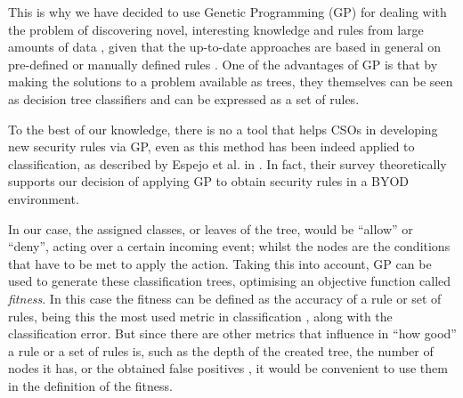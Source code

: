 \documentclass[runningheads]{llncs}
\begin{document}
This is why we have decided to use Genetic Programming (GP) for
dealing with the problem of discovering novel, interesting knowledge
and rules from large amounts of data \cite{freitas2002data}, given
that the up-to-date approaches are based in general on pre-defined or
manually defined rules \cite{ali2015analysis}. One of
the advantages of GP is that by making the solutions to a problem
available as trees, they themselves can be seen as decision
tree classifiers \cite{safavian1990survey} and can be expressed as a
set of rules.

To the best of our knowledge, there is no a tool that helps CSOs in
developing new security rules via GP, even as this method has been
indeed applied to classification, as described by Espejo et al. in
\cite{espejo2010survey}. In fact, their survey theoretically supports our
decision of applying GP to obtain security rules in a BYOD
environment.

In our case, the assigned classes, or leaves of the tree, would be ``allow''
or ``deny'', acting over a certain incoming event; whilst the nodes
are the conditions that have to be met to apply the action. Taking
this into account, GP can be used to generate these classification
trees, optimising an objective function called {\em fitness}. In this case the
fitness can be defined as the accuracy of a rule or set of rules, being this the most
used metric in classification \cite{witten2005data}, along with the
classification error. But since there are other metrics that influence in
``how good'' a rule or a set of rules is, such as the depth of the
created tree, the number of nodes it has, or the obtained false positives
\cite{back1996evolutionary}, it would be convenient to use them in
the definition of the fitness.
\end{document}
